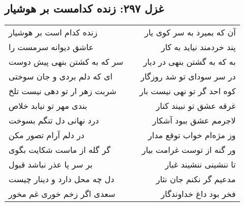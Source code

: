 \begin{center}
\section*{غزل ۲۹۷: زنده کدامست بر هوشیار}
\label{sec:297}
\begin{longtable}{l p{0.5cm} r}
زنده کدام است بر هوشیار
&&
آن که بمیرد به سر کوی یار
\\
عاشق دیوانه سرمست را
&&
پند خردمند نیاید به کار
\\
سر که به کشتن بنهی پیش دوست
&&
به که به گشتن بنهی در دیار
\\
ای که دلم بردی و جان سوختی
&&
در سر سودای تو شد روزگار
\\
شربت زهر ار تو دهی نیست تلخ
&&
کوه احد گر تو نهی نیست بار
\\
بندی مهر تو نیابد خلاص
&&
غرقه عشق تو نبیند کنار
\\
درد نهانی دل تنگم بسوخت
&&
لاجرمم عشق ببود آشکار
\\
در دلم آرام تصور مکن
&&
وز مژه‌ام خواب توقع مدار
\\
گر گله از ماست شکایت بگوی
&&
ور گنه از توست غرامت بیار
\\
بر سر پا عذر نباشد قبول
&&
تا ننشینی ننشیند غبار
\\
دل چه محل دارد و دینار چیست
&&
مدعیم گر نکنم جان نثار
\\
سعدی اگر زخم خوری غم مخور
&&
فخر بود داغ خداوندگار
\\
\end{longtable}
\end{center}
